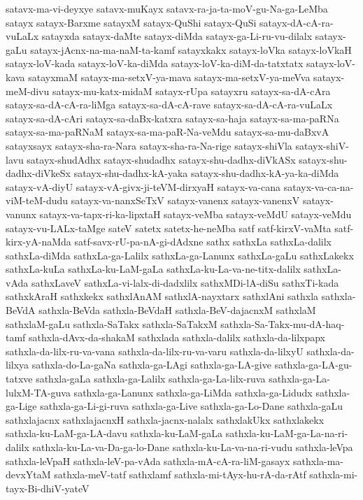 {satavx-ma-vi-deyxye
satavx-muKayx
satavx-ra-ja-ta-moV-gu-Na-ga-LeMba
satayx
satayx-Barxme
satayxM
satayx-QuShi
satayx-QuSi
satayx-dA-cA-ra-vuLaLx
satayxda
satayx-daMte
satayx-diMda
satayx-ga-Li-ru-vu-dilalx
satayx-gaLu
satayx-jAcnx-na-ma-naM-ta-kamf
satayxkakx
satayx-loVka
satayx-loVkaH
satayx-loV-kada
satayx-loV-ka-diMda
satayx-loV-ka-diM-da-tatxtatx
satayx-loV-kava
satayxmaM
satayx-ma-setxV-ya-mava
satayx-ma-setxV-ya-meVva
satayx-meM-divu
satayx-mu-katx-midaM
satayx-rUpa
satayxru
satayx-sa-dA-cAra
satayx-sa-dA-cA-ra-liMga
satayx-sa-dA-cA-rave
satayx-sa-dA-cA-ra-vuLaLx
satayx-sa-dA-cAri
satayx-sa-daBx-katxra
satayx-sa-haja
satayx-sa-ma-paRNa
satayx-sa-ma-paRNaM
satayx-sa-ma-paR-Na-veMdu
satayx-sa-mu-daBxvA
satayxsayx
satayx-sha-ra-Nara
satayx-sha-ra-Na-rige
satayx-shiVla
satayx-shiV-lavu
satayx-shudAdhx
satayx-shudadhx
satayx-shu-dadhx-diVkASx
satayx-shu-dadhx-diVkeSx
satayx-shu-dadhx-kA-yaka
satayx-shu-dadhx-kA-ya-ka-diMda
satayx-vA-diyU
satayx-vA-givx-ji-teVM-dirxyaH
satayx-va-cana
satayx-va-ca-na-viM-teM-dudu
satayx-va-nanxSeTxV
satayx-vanenx
satayx-vanenxV
satayx-vanunx
satayx-va-tapx-ri-ka-lipxtaH
satayx-veMba
satayx-veMdU
satayx-veMdu
satayx-vu-LALx-taMge
sateV
satetx
satetx-he-neMba
satf
satf-kirxV-vaMta
satf-kirx-yA-naMda
satf-savx-rU-pa-nA-gi-dAdxne
sathx
sathxLa
sathxLa-dalilx
sathxLa-diMda
sathxLa-ga-Lalilx
sathxLa-ga-Lanunx
sathxLa-gaLu
sathxLakekx
sathxLa-kuLa
sathxLa-ku-LaM-gaLa
sathxLa-ku-La-va-ne-titx-dalilx
sathxLa-vAda
sathxLaveV
sathxLa-vi-lalx-di-dadxlilx
sathxMDi-lA-diSu
sathxTi-kada
sathxkAraH
sathxkekx
sathxlAnAM
sathxlA-nayxtarx
sathxlAni
sathxla
sathxla-BeVdA
sathxla-BeVda
sathxla-BeVdaH
sathxla-BeV-dajacnxM
sathxlaM
sathxlaM-gaLu
sathxla-SaTakx
sathxla-SaTakxM
sathxla-Sa-Takx-mu-dA-haq-tamf
sathxla-dAvx-da-shakaM
sathxlada
sathxla-dalilx
sathxla-da-lilxpapx
sathxla-da-lilx-ru-va-vana
sathxla-da-lilx-ru-va-varu
sathxla-da-lilxyU
sathxla-da-lilxya
sathxla-do-La-gaNa
sathxla-ga-LAgi
sathxla-ga-LA-give
sathxla-ga-LA-gu-tatxve
sathxla-gaLa
sathxla-ga-Lalilx
sathxla-ga-La-lilx-ruva
sathxla-ga-La-lulxM-TA-guva
sathxla-ga-Lanunx
sathxla-ga-LiMda
sathxla-ga-Lidudx
sathxla-ga-Lige
sathxla-ga-Li-gi-ruva
sathxla-ga-Live
sathxla-ga-Lo-Dane
sathxla-gaLu
sathxlajacnx
sathxlajacnxH
sathxla-jacnx-nalalx
sathxlakUkx
sathxlakekx
sathxla-ku-LaM-ga-LA-davu
sathxla-ku-LaM-gaLa
sathxla-ku-LaM-ga-La-na-ri-dalilx
sathxla-ku-La-va-Da-ga-lo-Dane
sathxla-ku-La-va-na-ri-vudu
sathxla-leVpa
sathxla-leVpaH
sathxla-leV-pa-vAda
sathxla-mA-cA-ra-liM-gasayx
sathxla-ma-devxYtaM
sathxla-meV-tatf
sathxlamf
sathxla-mi-tAyx-hu-rA-da-rAtf
sathxla-mi-tayx-Bi-dhiV-yateV
}

